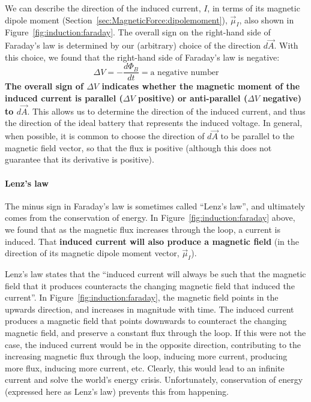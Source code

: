 We can describe the direction of the induced current, $I$, in terms of its magnetic dipole moment (Section~\ref{sec:MagneticForce:dipolemoment}), $\vec\mu_I$, also shown in Figure~\ref{fig:induction:faraday}. The overall sign on the right-hand side of Faraday's law is determined by our (arbitrary) choice of the direction $d\vec A$. With this choice, we found that the right-hand side of Faraday's law is negative:
\begin{equation}
\Delta V = -\frac{d\Phi_B}{dt}=\text{a negative number}
\end{equation}
\textbf{The overall sign of $\Delta V$ indicates whether the magnetic moment of the induced current is parallel ($\Delta V$ positive) or anti-parallel ($\Delta V$ negative) to $d\vec A$}. This allows us to determine the direction of the induced current, and thus the direction of the ideal battery that represents the induced voltage. In general, when possible, it is common to choose the direction of $d\vec A$ to be parallel to the magnetic field vector, so that the flux is positive (although this does not guarantee that its derivative is positive).

\paragraph{Lenz's law}

The minus sign in Faraday's law is sometimes called ``Lenz's law'', and ultimately comes from the conservation of energy. In Figure~\ref{fig:induction:faraday} above, we found that as the magnetic flux increases through the loop, a current is induced. That \textbf{induced current will also produce a magnetic field} (in the direction of its magnetic dipole moment vector, $\vec \mu_I$).

Lenz's law states that the ``induced current will always be such that the magnetic field that it produces counteracts the changing magnetic field that induced the current''. In Figure~\ref{fig:induction:faraday}, the magnetic field points in the upwards direction, and increases in magnitude with time. The induced current produces a magnetic field that points downwards to counteract the changing magnetic field, and preserve a constant flux through the loop. If this were not the case, the induced current would be in the opposite direction, contributing to the increasing magnetic flux through the loop, inducing more current, producing more flux, inducing more current, etc. Clearly, this would lead to an infinite current and solve the world's energy crisis. Unfortunately, conservation of energy (expressed here as Lenz's law) prevents this from happening.

